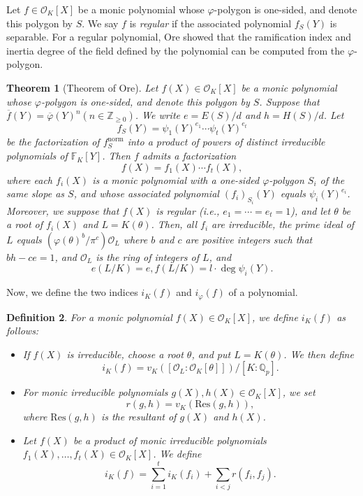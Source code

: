 \documentclass[10pt,a4paper]{amsart}
\newcommand{\field}[1]{\mathbb{#1}}
\newcommand{\Z}{\field{Z}}
\newcommand{\Q}{\field{Q}}
\newtheorem{theorem}{Theorem}[section]
\newtheorem{definition}[theorem]{Definition}
\numberwithin{equation}{section}
\begin{document}
    Let $f \in \mathcal{O}_K[X]$ be a monic polynomial whose $\varphi$-polygon is one-sided, and denote this polygon by $S$. 
    We say $f$ is \emph{regular} if the associated polynomial $f_S(Y)$ is separable. 
    For a regular polynomial, Ore showed that the ramification index and inertia degree of the field defined by the polynomial can be computed from the $\varphi$-polygon. 

    \begin{theorem}[Theorem of Ore]\label{thm:theorem of Ore}
      Let $f(X) \in \mathcal{O}_K[X]$ be a monic polynomial whose $\varphi$-polygon is one-sided, and denote this polygon by $S$. 
      Suppose that $\overline{f}(Y) = \overline{\varphi}(Y)^n (n \in \Z_{\ge 0})$. 
      We write $e=E(S)/d$ and $h=H(S)/d$. Let 
      \[
        f_S(Y) = \psi_1(Y)^{e_1} \cdots \psi_t(Y)^{e_t} 
      \]
      be the factorization of $f_S^{\mathrm{norm}}$ into a product of powers of distinct irreducible polynomials
      of $\field{F}_K[Y]$. 
      Then $f$ admits a factorization 
      \[
        f(X) = f_1(X) \cdots f_t(X), 
      \]
      where each $f_i(X)$ is a monic polynomial with a one-sided $\varphi$-polygon $S_{i}$ 
      of the same slope as $S$, and whose associated polynomial $(f_i)_{S_{i}}(Y)$ equals $\psi_i(Y)^{e_i}$. 
      Moreover, we suppose that $f(X)$ is regular (i.e., $e_1 = \cdots = e_t = 1$), and let $\theta$ be a root of $f_i(X)$ and $L = K(\theta)$. 
      Then, all $f_i$ are irreducible, the prime ideal of $L$ equals $(\varphi(\theta)^b/\pi^c)\mathcal{O}_L$ 
      where $b$ and $c$ are positive integers such that $bh - ce = 1$, and $\mathcal{O}_L$ is the ring of integers of $L$, and 
      \[
        e(L/K) = e, f(L/K) = l \cdot \deg \psi_i(Y). 
      \]
    \end{theorem}

    Now, we define the two indices $i_K(f)$ and $i_\varphi(f)$ of a polynomial. 

    \begin{definition}\label{def:index of K}
      For a monic polynomial $f(X) \in \mathcal{O}_K[X]$, we define $i_K(f)$ as follows: 
      \begin{itemize}
        \item If $f(X)$ is irreducible, choose a root $\theta$, and put $L=K(\theta)$. 
          We then define 
          \[
            i_K(f) = v_K([\mathcal{O}_L:\mathcal{O}_K[\theta]])/[K:\Q_p]. 
          \]
        \item For monic irreducible polynomials $g(X),h(X) \in \mathcal{O}_K[X]$, 
          we set 
          \[
             r(g,h) = v_K(\mathrm{Res}(g,h)), 
          \]
          where $\mathrm{Res}(g,h)$ is the resultant of $g(X)$ and $h(X)$. 
        \item Let $f(X)$ be a product of monic irreducible polynomials $f_1(X), \dots ,f_t(X) \in \mathcal{O}_K[X]$. 
          We define 
          \[
            i_K(f) = \sum_{i = 1}^t i_K(f_i) + \sum_{i<j} r(f_i,f_j). 
          \]
      \end{itemize}
    \end{definition}
\end{document}
